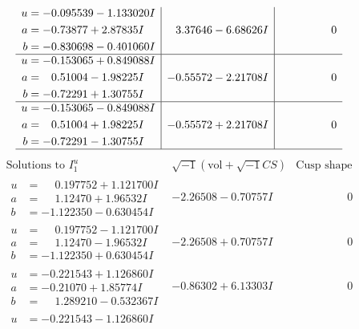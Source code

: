 \documentclass[1p]{elsarticle_modified}
\theoremstyle{definition}
\newcommand{\I}{\sqrt{-1}}
\begin{document}
$$\begin{array}{c|c|c}
\begin{aligned}
u &= -0.095539 - 1.133020 I \\
a &= -0.73877 + 2.87835 I \\
b &= -0.830698 - 0.401060 I\end{aligned}
 & \phantom{-}3.37646 - 6.68626 I & \phantom{-0.000000 } 0 \\ \hline\begin{aligned}
u &= -0.153065 + 0.849088 I \\
a &= \phantom{-}0.51004 - 1.98225 I \\
b &= -0.72291 + 1.30755 I\end{aligned}
 & -0.55572 - 2.21708 I & \phantom{-0.000000 } 0 \\ \hline\begin{aligned}
u &= -0.153065 - 0.849088 I \\
a &= \phantom{-}0.51004 + 1.98225 I \\
b &= -0.72291 - 1.30755 I\end{aligned}
 & -0.55572 + 2.21708 I & \phantom{-0.000000 } 0\\
 \hline 
 \end{array}$$\newpage$$\begin{array}{c|c|c}  
\text{Solutions to }I^u_{1}& \I (\text{vol} + \sqrt{-1}CS) & \text{Cusp shape}\\
 \hline 
\begin{aligned}
u &= \phantom{-}0.197752 + 1.121700 I \\
a &= \phantom{-}1.12470 + 1.96532 I \\
b &= -1.122350 - 0.630454 I\end{aligned}
 & -2.26508 - 0.70757 I & \phantom{-0.000000 } 0 \\ \hline\begin{aligned}
u &= \phantom{-}0.197752 - 1.121700 I \\
a &= \phantom{-}1.12470 - 1.96532 I \\
b &= -1.122350 + 0.630454 I\end{aligned}
 & -2.26508 + 0.70757 I & \phantom{-0.000000 } 0 \\ \hline\begin{aligned}
u &= -0.221543 + 1.126860 I \\
a &= -0.21070 + 1.85774 I \\
b &= \phantom{-}1.289210 - 0.532367 I\end{aligned}
 & -0.86302 + 6.13303 I & \phantom{-0.000000 } 0 \\ \hline\begin{aligned}
u &= -0.221543 - 1.126860 I \\

\end{aligned}
\end{array}$$
\end{document}

